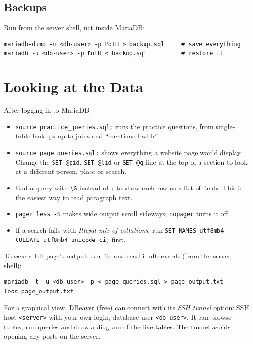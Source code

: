\documentclass[11pt]{article}
\newcommand{\code}[1]{\texttt{#1}}
\begin{document}
\subsection{Backups}

Run from the server shell, not inside MariaDB:

\begin{lstlisting}
mariadb-dump -u <db-user> -p PotH > backup.sql     # save everything
mariadb -u <db-user> -p PotH < backup.sql          # restore it
\end{lstlisting}

\section{Looking at the Data}

After logging in to MariaDB:

\begin{itemize}
  \item \code{source practice\_queries.sql;} runs the practice questions,
  from single-table lookups up to joins and ``mentioned with''.
  \item \code{source page\_queries.sql;} shows everything a website page
  would display. Change the \code{SET @pid}, \code{SET @lid} or
  \code{SET @q} line at the top of a section to look at a different person,
  place or search.
  \item End a query with \code{\textbackslash G} instead of \code{;} to
  show each row as a list of fields. This is the easiest way to read
  paragraph text.
  \item \code{pager less -S} makes wide output scroll sideways;
  \code{nopager} turns it off.
  \item If a search fails with \textit{Illegal mix of collations}, run
  \code{SET NAMES utf8mb4 COLLATE utf8mb4\_unicode\_ci;} first.
\end{itemize}

To save a full page's output to a file and read it afterwards (from the
server shell):

\begin{lstlisting}
mariadb -t -u <db-user> -p < page_queries.sql > page_output.txt
less page_output.txt
\end{lstlisting}

For a graphical view, DBeaver (free) can connect with its \textit{SSH
tunnel} option: SSH host \code{<server>} with your own login, database
user \code{<db-user>}. It can browse tables, run queries and draw a
diagram of the live tables. The tunnel avoids opening any ports on the
server.
\end{document}

